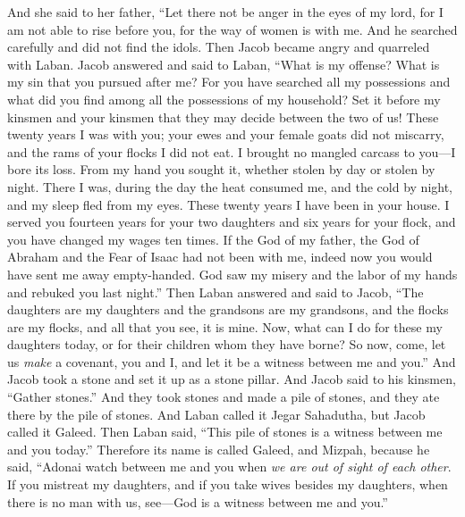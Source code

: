 \begin{biblechapter}
{{{\verse And she said to her father, “Let there not be anger in the eyes of my lord, for I am not able to rise before you, for the way of women is with me. And he searched carefully and did not find the idols.
\verse Then Jacob became angry and quarreled with Laban. Jacob answered and said to Laban, “What is my offense? What is my sin that you pursued after me?
\verse For you have searched all my possessions and what did you find among all the possessions of my household? Set it before my kinsmen and your kinsmen that they may decide between the two of us!
\verse These twenty years I was with you; your ewes and your female goats did not miscarry, and the rams of your flocks I did not eat.
\verse I brought no mangled carcass to you—I bore its loss. From my hand you sought it, whether stolen by day or stolen by night.
\verse There I was, during the day the heat consumed me, and the cold by night, and my sleep fled from my eyes.
\verse These twenty years I have been in your house. I served you fourteen years for your two daughters and six years for your flock, and you have changed my wages ten times.
\verse If the God of my father, the God of Abraham and the Fear of Isaac had not been with me, indeed now you would have sent me away empty-handed. God saw my misery and the labor of my hands and rebuked you last night.”
\verse Then Laban answered and said to Jacob, “The daughters are my daughters and the grandsons are my grandsons, and the flocks are my flocks, and all that you see, it is mine. Now, what can I do for these my daughters today, or for their children whom they have borne?
\verse So now, come, let us \textit{make} a covenant, you and I, and let it be a witness between me and you.”
\verse And Jacob took a stone and set it up as a stone pillar.
\verse And Jacob said to his kinsmen, “Gather stones.” And they took stones and made a pile of stones, and they ate there by the pile of stones.
\verse And Laban called it Jegar Sahadutha, but Jacob called it Galeed.
\verse Then Laban said, “This pile of stones is a witness between me and you today.” Therefore its name is called Galeed,
\verse and Mizpah, because he said, “Adonai watch between me and you when \textit{we are out of sight of each other}.
\verse If you mistreat my daughters, and if you take wives besides my daughters, when there is no man with us, see—God is a witness between me and you.”
}}}
\end{biblechapter}
